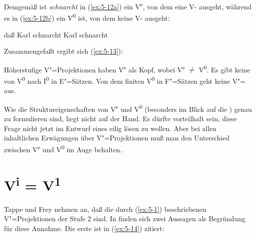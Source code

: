 \documentclass[output=paper]{LSP/langsci}
\begin{document}
\begin{exe}
\ex%
\label{ex:5-11}
\begin{xlist}
\end{xlist}
\end{exe}
Demgemäß ist \textit{schnarcht} in (\ref{ex:5-12a}) ein V\textsuperscript{e}, von dem eine V- ausgeht, während es in (\ref{ex:5-12b}) ein V\textsuperscript{0} ist, von dem keine V- ausgeht:

\begin{exe}
\ex%
\label{ex:5-12}
\begin{xlist}
\ex%
\label{ex:5-12a}
daß Karl schnarcht
\ex%
\label{ex:5-12b}
Karl schnarcht
\end{xlist}
\end{exe}
Zusammengefaßt ergibt sich (\ref{ex:5-13}):

\begin{exe}
\ex%
\label{ex:5-13}
\begin{xlisti}
\ex%
\label{ex:5-13i}
Höherstufige V"=Projektionen haben V\textsuperscript{e} als Kopf, wobei V\textsuperscript{e} ${\neq}$ V\textsuperscript{0}.
\ex%
\label{ex:5-13ii}
Es gibt keine  von V\textsuperscript{0} nach I\textsuperscript{0} in E"=Sätzen.
\ex%
\label{ex:5-13iii}
Von dem finiten  V\textsuperscript{0} in F"=Sätzen geht keine V"= aus.
\end{xlisti}
\end{exe}
Wie die Struktureigenschaften von V\textsuperscript{e} und
V\textsuperscript{0} (besonders im Blick auf die )
genau zu formulieren sind, liegt nicht auf der Hand. Es dürfte
vorteilhaft sein, diese Frage nicht jetzt im Entwurf eines 
eilig lösen zu wollen. Aber bei allen inhaltlichen Erwägungen über
V"=Projektionen muß man den Unterschied zwischen V\textsuperscript{e}
und V\textsuperscript{0} im Auge behalten.

\section{V\textsuperscript{i} = V\textsuperscript{1}}%
\label{sec:5-2}

\ssubsection{}%
\label{subsec:5-2-1}
Tappe und Frey nehmen an, daß die durch (\ref{ex:5-1}) beschriebenen  V"=Projektionen der Stufe 2 sind. In \citet{FreyTappe1991} finden sich zwei Aussagen als Begründung für diese Annahme. Die erste ist in (\ref{ex:5-14}) zitiert:
\end{document}
